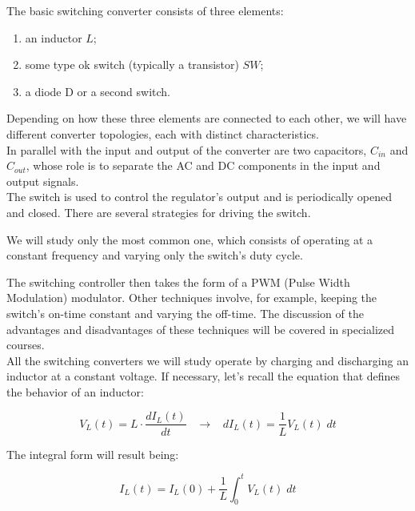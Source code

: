 \documentclass[../main.tex]{subfiles}
\begin{document}
The basic switching converter consists of three elements:

\begin{enumerate}[label=\textbf{-}]
	\item an inductor $L$;
	\item some type ok switch (typically a transistor) $SW$;
	\item a diode D or a second switch.
\end{enumerate}

Depending on how these three elements are connected to each other, we will have different converter topologies, each with distinct characteristics.\\

In parallel with the input and output of the converter are two capacitors, $C_{in}$ and $C_{out}$, whose role is to separate the AC and DC components in the input and output signals.\\

The switch is used to control the regulator’s output and is periodically opened and closed. There are several strategies for driving the switch. 

We will study only the most common one, which consists of operating at a constant frequency and varying only the switch’s duty cycle. 

The switching controller then takes the form of a PWM (Pulse Width Modulation) modulator. Other techniques involve, for example, keeping the switch’s on-time constant and varying the off-time. The discussion of the advantages and disadvantages of these techniques will be covered in specialized courses.\\

All the switching converters we will study operate by charging and discharging an inductor at a constant voltage. If necessary, let’s recall the equation that defines the behavior of an inductor:

\begin{equation}
	V_L(t) = L \cdot \frac{dI_L(t)}{dt} \hspace{10pt} \rightarrow \hspace{10pt}  dI_L(t) = \frac{1}{L}V_L(t)\;dt
\end{equation}

The integral form will result being:

\begin{equation}
	I_L(t) = I_L(0) + \frac{1}{L} \int_0^t V_L(t) \; dt 	
\end{equation}
\end{document}
